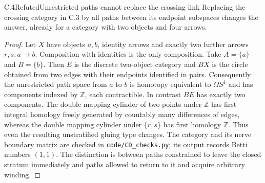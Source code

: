 \begin{statement}{C.4}{Refuted}{Unrestricted paths cannot replace the crossing link}
Replacing the crossing category in C.3 by all paths between its endpoint subspaces changes the answer, already for a category with two objects and four arrows.
\end{statement}
\begin{proof}
Let $X$ have objects $a,b$, identity arrows and exactly two further arrows $r,s:a\to b$. Composition with identities is the only composition. Take $A=\{a\}$ and $B=\{b\}$. Then $E$ is the discrete two-object category and $BX$ is the circle obtained from two edges with their endpoints identified in pairs. Consequently the unrestricted path space from $a$ to $b$ is homotopy equivalent to $\Omega S^1$ and has components indexed by $\mathbb Z$, each contractible. In contrast $BE$ has exactly two components. The double mapping cylinder of two points under $\mathbb Z$ has first integral homology freely generated by countably many differences of edges, whereas the double mapping cylinder under $\{r,s\}$ has first homology $\mathbb Z$. Thus even the resulting unstratified gluing type changes. The category and its nerve boundary matrix are checked in \texttt{code/CD\_checks.py}; its output records Betti numbers $(1,1)$. The distinction is between paths constrained to leave the closed stratum immediately and paths allowed to return to it and acquire arbitrary winding.
\end{proof}

